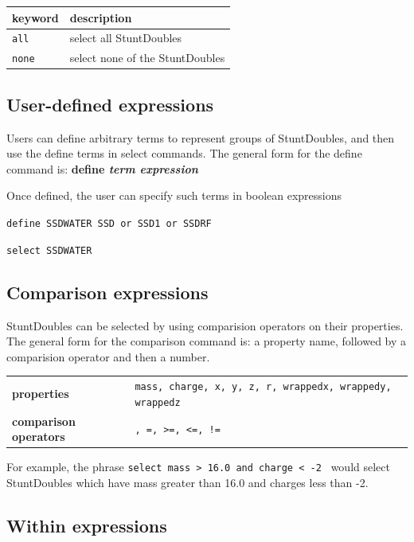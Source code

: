 \documentclass[letterpaper]{report}
\begin{document}
\begin{center}
\begin{tabular}{|ll|}
\hline
{\bf keyword} & {\bf description} \\
\hline
{\tt all} & select all StuntDoubles \\
{\tt none} & select none of the StuntDoubles \\
\hline
\end{tabular}
\end{center}

\subsection{\label{section:userdefined}User-defined expressions}

Users can define arbitrary terms to represent groups of StuntDoubles,
and then use the define terms in select commands. The general form for
the define command is: {\bf define {\it term expression}}

Once defined, the user can specify such terms in boolean expressions

{\tt define SSDWATER SSD or SSD1 or SSDRF}

{\tt select SSDWATER}

\subsection{\label{section:comparison}Comparison expressions}

StuntDoubles can be selected by using comparision operators on their
properties. The general form for the comparison command is: a property
name, followed by a comparision operator and then a number. 

\begin{center}
\begin{tabular}{|l|l|}
\hline
{\bf properties} & {\tt mass, charge, x, y, z, r, wrappedx, wrappedy, wrappedz} \\
{\bf comparison operators} & {\tt <, >, =, >=, <=, !=} \\
\hline
\end{tabular}
\end{center}

For example, the phrase {\tt select mass > 16.0 and charge < -2 }
would select StuntDoubles which have mass greater than 16.0 and charges
less than -2.
 
\subsection{\label{section:within}Within expressions}
\end{document}
